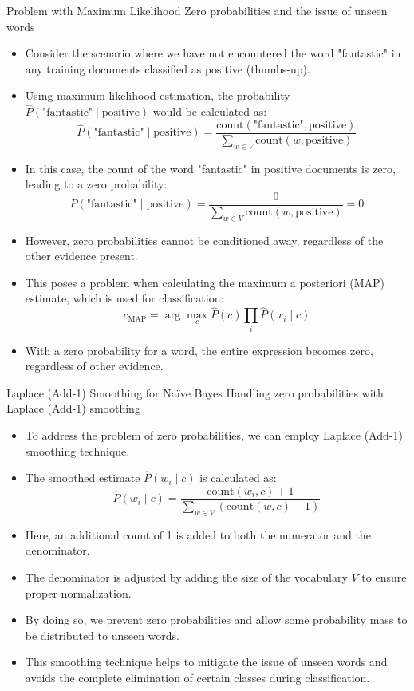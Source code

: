 \documentclass[handout]{beamer}
\begin{document}
\begin{frame}{Problem with Maximum Likelihood}
\scriptsize
Zero probabilities and the issue of unseen words
\begin{itemize}
    \item Consider the scenario where we have not encountered the word "fantastic" in any training documents classified as positive (thumbs-up).
    \item Using maximum likelihood estimation, the probability $\hat{P}(\text{"fantastic"} \mid \text{positive})$ would be calculated as:
    \[
    \hat{P}(\text{"fantastic"} \mid \text{positive}) = \frac{\text{count}(\text{"fantastic"}, \text{positive})}{\sum_{w \in V} \text{count}(w, \text{positive})}
    \]
    \item In this case, the count of the word "fantastic" in positive documents is zero, leading to a zero probability:
    \[
    \hat{P}(\text{"fantastic"} \mid \text{positive}) = \frac{0}{\sum_{w \in V} \text{count}(w, \text{positive})} = 0
    \]
    \item However, zero probabilities cannot be conditioned away, regardless of the other evidence present.
    \item This poses a problem when calculating the maximum a posteriori (MAP) estimate, which is used for classification:
    \[
    c_{\text{MAP}} = \arg\max_c \hat{P}(c) \prod_{i} \hat{P}(x_i \mid c)
    \]
    \item With a zero probability for a word, the entire expression becomes zero, regardless of other evidence.
\end{itemize}
\end{frame}

\begin{frame}{Laplace (Add-1) Smoothing for Naïve Bayes}
\scriptsize
Handling zero probabilities with Laplace (Add-1) smoothing
\begin{itemize}
    \item To address the problem of zero probabilities, we can employ Laplace (Add-1) smoothing technique.
    \item The smoothed estimate $\hat{P}(w_i \mid c)$ is calculated as:
    \[
    \hat{P}(w_i \mid c) = \frac{\text{count}(w_i, c) + 1}{\sum_{w \in V} (\text{count}(w, c) + 1)}
    \]
    \item Here, an additional count of 1 is added to both the numerator and the denominator.
    \item The denominator is adjusted by adding the size of the vocabulary $V$ to ensure proper normalization.
    \item By doing so, we prevent zero probabilities and allow some probability mass to be distributed to unseen words.
    \item This smoothing technique helps to mitigate the issue of unseen words and avoids the complete elimination of certain classes during classification.
\end{itemize}
\end{frame}
\end{document}

